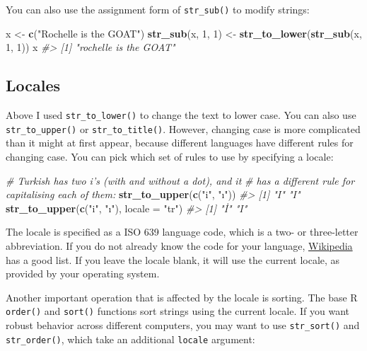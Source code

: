 \documentclass[
]{book}
\newenvironment{Shaded}{\begin{snugshade}}{\end{snugshade}}
\newcommand{\CommentTok}[1]{\textcolor[rgb]{0.56,0.35,0.01}{\textit{#1}}}
\newcommand{\DataTypeTok}[1]{\textcolor[rgb]{0.13,0.29,0.53}{#1}}
\newcommand{\DecValTok}[1]{\textcolor[rgb]{0.00,0.00,0.81}{#1}}
\newcommand{\KeywordTok}[1]{\textcolor[rgb]{0.13,0.29,0.53}{\textbf{#1}}}
\newcommand{\NormalTok}[1]{#1}
\newcommand{\StringTok}[1]{\textcolor[rgb]{0.31,0.60,0.02}{#1}}
\begin{document}
You can also use the assignment form of \texttt{str\_sub()} to modify strings:

\begin{Shaded}
\begin{Highlighting}[]
\NormalTok{x <-}\StringTok{ }\KeywordTok{c}\NormalTok{(}\StringTok{"Rochelle is the GOAT"}\NormalTok{)}
\KeywordTok{str_sub}\NormalTok{(x, }\DecValTok{1}\NormalTok{, }\DecValTok{1}\NormalTok{) <-}\StringTok{ }\KeywordTok{str_to_lower}\NormalTok{(}\KeywordTok{str_sub}\NormalTok{(x, }\DecValTok{1}\NormalTok{, }\DecValTok{1}\NormalTok{))}
\NormalTok{x}
\CommentTok{#> [1] "rochelle is the GOAT"}
\end{Highlighting}
\end{Shaded}

\hypertarget{locales}{%
\subsection{Locales}\label{locales}}

Above I used \texttt{str\_to\_lower()} to change the text to lower case. You can also use \texttt{str\_to\_upper()} or \texttt{str\_to\_title()}. However, changing case is more complicated than it might at first appear, because different languages have different rules for changing case. You can pick which set of rules to use by specifying a locale:

\begin{Shaded}
\begin{Highlighting}[]
\CommentTok{# Turkish has two i's (with and without a dot), and it}
\CommentTok{# has a different rule for capitalising each of them:}
\KeywordTok{str_to_upper}\NormalTok{(}\KeywordTok{c}\NormalTok{(}\StringTok{"i"}\NormalTok{, }\StringTok{"ı"}\NormalTok{))}
\CommentTok{#> [1] "I" "I"}
\KeywordTok{str_to_upper}\NormalTok{(}\KeywordTok{c}\NormalTok{(}\StringTok{"i"}\NormalTok{, }\StringTok{"ı"}\NormalTok{), }\DataTypeTok{locale =} \StringTok{"tr"}\NormalTok{)}
\CommentTok{#> [1] "İ" "I"}
\end{Highlighting}
\end{Shaded}

The locale is specified as a ISO 639 language code, which is a two- or three-letter abbreviation. If you do not already know the code for your language, \href{https://en.wikipedia.org/wiki/List_of_ISO_639-1_codes}{Wikipedia} has a good list. If you leave the locale blank, it will use the current locale, as provided by your operating system.

Another important operation that is affected by the locale is sorting. The base R \texttt{order()} and \texttt{sort()} functions sort strings using the current locale. If you want robust behavior across different computers, you may want to use \texttt{str\_sort()} and \texttt{str\_order()}, which take an additional \texttt{locale} argument:
\end{document}
